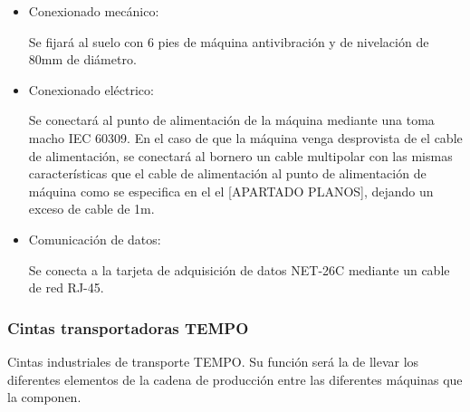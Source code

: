 		\begin{itemize}
				\item{Conexionado mecánico:}
				
				Se fijará al suelo con 6 pies de máquina antivibración y de nivelación de 80mm de diámetro.

				\item{Conexionado eléctrico:}

				Se conectará al punto de alimentación de la máquina mediante una  toma macho IEC 60309. En el caso de que la máquina venga desprovista de el cable de alimentación, se conectará al bornero un cable multipolar con las mismas características que el cable de alimentación al punto de alimentación de máquina como se especifica en el el [APARTADO PLANOS], dejando un exceso de cable de 1m. \
				
				\item{Comunicación de datos:}

				Se conecta a la tarjeta de adquisición de datos NET-26C mediante un cable de red RJ-45.
		\end{itemize}

\newpage


	\subsubsection{Cintas transportadoras TEMPO}

	

	Cintas industriales de transporte TEMPO. Su función será la de llevar los diferentes elementos de la cadena de producción entre las diferentes máquinas que la componen. \\

